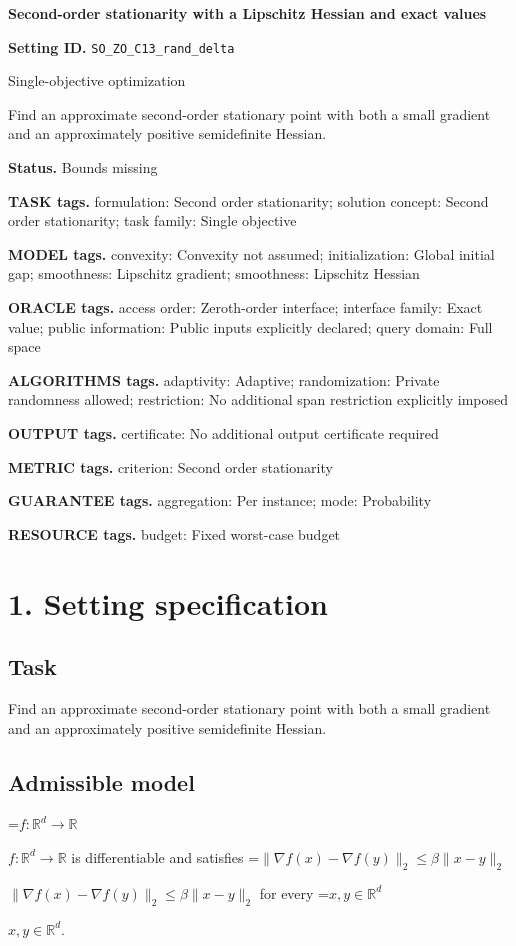 \documentclass[10pt,a4paper]{article}
\newcommand{\AtlasMath}[1]{\par\begingroup\centering\setbox0=\hbox{$\displaystyle #1$}\ifdim\wd0>1.4\linewidth\typeout{ATLAS WIDE FORMULA: \the\wd0}\fi\ifdim\wd0>\linewidth\resizebox{\linewidth}{!}{\box0}\else\box0\fi\par\endgroup}
\newcommand{\AtlasInlineMath}[1]{\begingroup\setbox0=\hbox{$#1$}\ifdim\wd0>.4\linewidth\endgroup\AtlasMath{#1}\else\endgroup$#1$\fi}
\begin{document}
\raggedright

{\LARGE\bfseries\sffamily\color{AtlasNavy} Second-order stationarity with a Lipschitz Hessian and exact values\par}\vspace{5pt}
\textbf{Setting ID.} \texttt{SO\_\allowbreak{}ZO\_\allowbreak{}C13\_\allowbreak{}rand\_\allowbreak{}delta}

Single-objective optimization

Find an approximate second-order stationary point with both a small gradient and an approximately positive semidefinite Hessian.

\textbf{Status.} Bounds missing

\textbf{TASK tags.} formulation: Second order stationarity; solution concept: Second order stationarity; task family: Single objective

\textbf{MODEL tags.} convexity: Convexity not assumed; initialization: Global initial gap; smoothness: Lipschitz gradient; smoothness: Lipschitz Hessian

\textbf{ORACLE tags.} access order: Zeroth-order interface; interface family: Exact value; public information: Public inputs explicitly declared; query domain: Full space

\textbf{ALGORITHMS tags.} adaptivity: Adaptive; randomization: Private randomness allowed; restriction: No additional span restriction explicitly imposed

\textbf{OUTPUT tags.} certificate: No additional output certificate required

\textbf{METRIC tags.} criterion: Second order stationarity

\textbf{GUARANTEE tags.} aggregation: Per instance; mode: Probability

\textbf{RESOURCE tags.} budget: Fixed worst-case budget

\section{1. Setting specification}
\subsection{Task}
Find an approximate second-order stationary point with both a small gradient and an approximately positive semidefinite Hessian.

\subsection{Admissible model}
\AtlasInlineMath{f:\mathbb{R}^d\to\mathbb{R}} is differentiable and satisfies \AtlasInlineMath{\|\nabla f(x)-\nabla f(y)\|_2\le\beta\|x-y\|_2} for every \AtlasInlineMath{x,y\in\mathbb{R}^d}.
\end{document}
